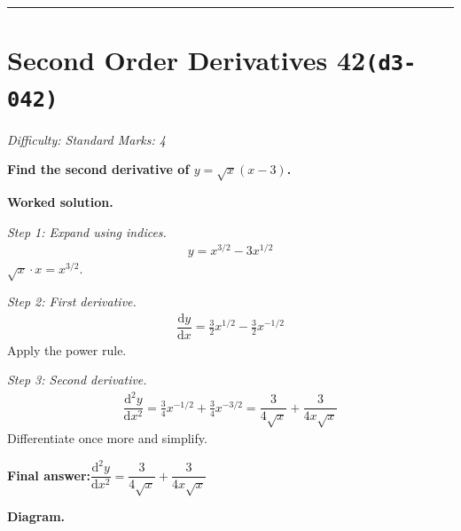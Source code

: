 \documentclass[11pt]{article}
\newcommand{\question}[1]{\par\medskip\noindent\textbf{#1}\par}
\begin{document}
\medskip\hrule

\section*{Second Order Derivatives 42\quad\small\texttt{(d3-042)}}
\textit{Difficulty: Standard \quad\textbar\quad Marks: 4}

\question{Find the second derivative of \( y = \sqrt{x}(x - 3) \).}

\textbf{Worked solution.}

\textit{Step 1: Expand using indices.}
\[\begin{gathered}
y = x^{3/2} - 3x^{1/2}
\end{gathered}\]
\( \sqrt{x} \cdot x = x^{3/2} \).

\textit{Step 2: First derivative.}
\[\begin{gathered}
\dfrac{\mathrm{d}y}{\mathrm{d}x} = \tfrac{3}{2}x^{1/2} - \tfrac{3}{2}x^{-1/2}
\end{gathered}\]
Apply the power rule.

\textit{Step 3: Second derivative.}
\[\begin{gathered}
\dfrac{\mathrm{d}^2y}{\mathrm{d}x^2} = \tfrac{3}{4}x^{-1/2} + \tfrac{3}{4}x^{-3/2} = \dfrac{3}{4\sqrt{x}} + \dfrac{3}{4x\sqrt{x}}
\end{gathered}\]
Differentiate once more and simplify.

\begin{answerbox}
\textbf{Final answer:}\quad \(\displaystyle  \dfrac{\mathrm{d}^2y}{\mathrm{d}x^2} = \dfrac{3}{4\sqrt{x}} + \dfrac{3}{4x\sqrt{x}} \)
\end{answerbox}
\textbf{Diagram.}
\end{document}
